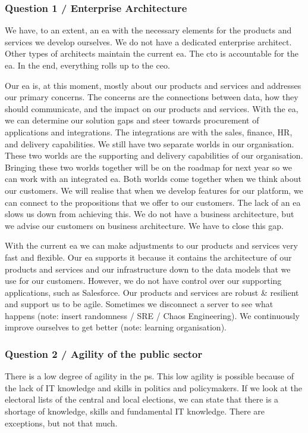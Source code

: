 \subsubsection{Question 1 / Enterprise Architecture}
We have, to an extent, an \gls{ea} with the necessary elements for the products and services we develop ourselves. We do not have a dedicated enterprise architect. Other types of architects maintain the current \gls{ea}. The \acrshort{cto} is accountable for the \gls{ea}. In the end, everything rolls up to the \acrshort{ceo}. 

Our \gls{ea} is, at this moment, mostly about our products and services and addresses our primary concerns. The concerns are the connections between data, how they should communicate, and the impact on our products and services. With the \gls{ea}, we can determine our solution gaps and steer towards procurement of applications and integrations. The integrations are with the sales, finance, HR, and delivery capabilities. We still have two separate worlds in our organisation. These two worlds are the supporting and delivery capabilities of our organisation. Bringing these two worlds together will be on the roadmap for next year so we can work with an integrated \gls{ea}. Both worlds come together when we think about our customers. We will realise that when we develop features for our platform, we can connect to the propositions that we offer to our customers. The lack of an \gls{ea} slows us down from achieving this. We do not have a business architecture, but we advise our customers on business architecture. We have to close this gap. 

With the current \gls{ea} we can make adjustments to our products and services very fast and flexible. Our \gls{ea} supports it because it contains the architecture of our products and services and our infrastructure down to the data models that we use for our customers. However, we do not have control over our supporting applications, such as Salesforce. Our products and services are \gls{robust} \& \gls{resilient} and support us to be \gls{agile}. Sometimes we disconnect a server to see what happens (note: insert randomness / SRE / Chaos Engineering). We continuously improve ourselves to get better (note: learning organisation).
\subsubsection{Question 2 / Agility of the public sector}
There is a low degree of agility in the \gls{ps}. This low \gls{agility} is possible because of the lack of IT knowledge and skills in politics and policymakers. If we look at the electoral lists of the central and local elections, we can state that there is a shortage of knowledge, skills and fundamental IT knowledge. There are exceptions, but not that much.

